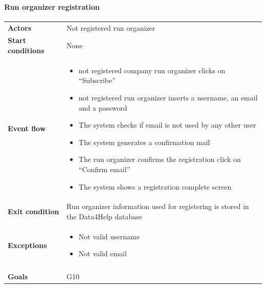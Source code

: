 \newpage
\paragraph{Run organizer registration}
\begin{center}
\begin{table}[H]
\centering
\begin{tabular}{l|p{}}
\textbf{Actors} & Not registered run organizer \\
\textbf{Start conditions} & None \\
\textbf{Event flow}  & \begin{minipage}[t]{0.7\textwidth}
    \begin{itemize}
       \item not registered company run organizer clicks on “Subscribe”
\item not registered run organizer inserts a username, an email and a password
\item The system checks if email is not used by any other user
\item The system generates a confirmation mail
\item The run organizer confirms the registration click on “Confirm email”
\item The system shows a registration complete screen


    \end{itemize}
    
\end{minipage} \\
\textbf{Exit condition} & Run organizer information used for registering is stored in the Data4Help database \\
\textbf{Exceptions} & \begin{minipage}[t]{0.7\textwidth}
    \begin{itemize}
       \item Not valid username
\item Not valid email
    \end{itemize}
    
\end{minipage} \\ \\
\textbf{Goals} & G10
\end{tabular}

\end{table}
\end{center}
